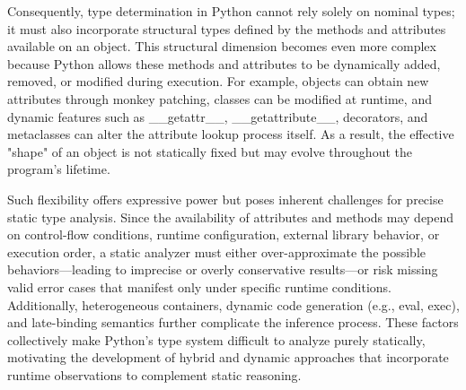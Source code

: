 Consequently, type determination in Python cannot rely solely on nominal types;
it must also incorporate structural types defined by the methods and attributes
available on an object.
This structural dimension becomes even more complex because Python allows these
methods and attributes to be dynamically added, removed, or modified during
execution.
For example, objects can obtain new attributes through monkey patching, classes
can be modified at runtime, and dynamic features such as \_\_getattr\_\_,
\_\_getattribute\_\_, decorators, and metaclasses can alter the attribute
lookup process itself.
As a result, the effective "shape" of an object is not statically fixed but may
evolve throughout the program’s lifetime.

Such flexibility offers expressive power but poses inherent challenges for
precise static type analysis.
Since the availability of attributes and methods may depend on control-flow
conditions, runtime configuration, external library behavior, or execution
order, a static analyzer must either over-approximate the possible
behaviors—leading to imprecise or overly conservative results—or risk missing
valid error cases that manifest only under specific runtime conditions.
Additionally, heterogeneous containers, dynamic code generation (e.g., eval,
exec), and late-binding semantics further complicate the inference process.
These factors collectively make Python’s type system difficult to analyze
purely statically, motivating the development of hybrid and dynamic approaches
that incorporate runtime observations to complement static reasoning.
